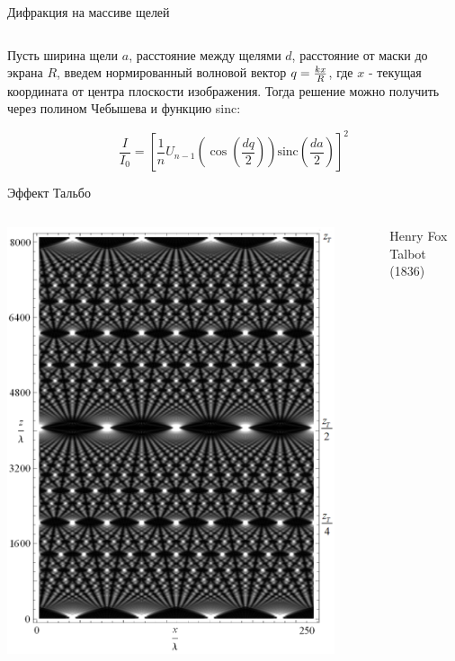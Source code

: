 \documentclass[9pt, compress, xcolor=table]{beamer}
\begin{document}
\begin{frame}{Дифракция на массиве щелей}
\begin{columns}[c]
\begin{center}
\end{center}
\end{columns}

Пусть ширина щели $a$, расстояние между щелями $d$, расстояние от маски до экрана $R$, введем нормированный волновой вектор $q=\frac{k\*x}{R}$, где $x$ - текущая координата от центра плоскости изображения. Тогда решение можно получить через полином Чебышева и функцию sinc:

\begin{equation*}
\frac{I}{I_0}=\left[\frac{1}{n}U_{n-1}\left(\cos\left(\frac{d q}{2}\right)\right) \text{sinc}\left(\frac{d a}{2}\right)\right]^2
\end{equation*}
\end{frame}

\begin{frame}{Эффект Тальбо}

\begin{columns}[c]
\column{6.5cm}
\begin{center}
\includegraphics[width=0.9\textwidth]{talbot}
\end{center}
\column{6cm}
\begin{center}
Henry Fox Talbot (1836)


\end{center}
\end{columns}
\end{frame}
\end{document}
